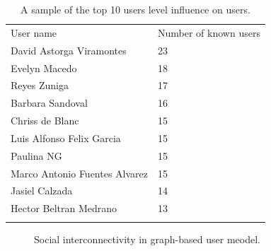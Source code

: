 \begin{table}
\small
\caption{A sample of the top 10 users level influence on users.}
\label{tab:knownUsers_3} 
\centering
\small
\begin{tabular}{p{3cm} p{3cm}  }
\hline\noalign{\smallskip}
 User name & Number of known users \\
\noalign{\smallskip}\hline\noalign{\smallskip}
\small{David Astorga Viramontes} & \small{23}  \\ \hline 
\small{Evelyn Macedo} & \small{18}  \\ \hline
\small{Reyes Zuniga} & \small{17}  \\ \hline
\small{Barbara Sandoval} & \small{16}  \\ \hline
\small{Chriss de Blanc} & \small{15}  \\ \hline
\small{Luis Alfonso Felix Garcia} & \small{15}  \\ \hline
\small{Paulina NG} & \small{15}  \\ \hline
\small{Marco Antonio Fuentes Alvarez} & \small{15}  \\ \hline 
\small{Jasiel Calzada} & \small{14}  \\ \hline 
\small{Hector Beltran Medrano} & \small{13}  \\ \hline 
\noalign{\smallskip}\hline
\end{tabular}
\end{table}


\begin{figure}
\centering
{} %
\caption{Social interconnectivity in graph-based user meodel.}
\label{fig:graphKnown_3}   
\end{figure}

